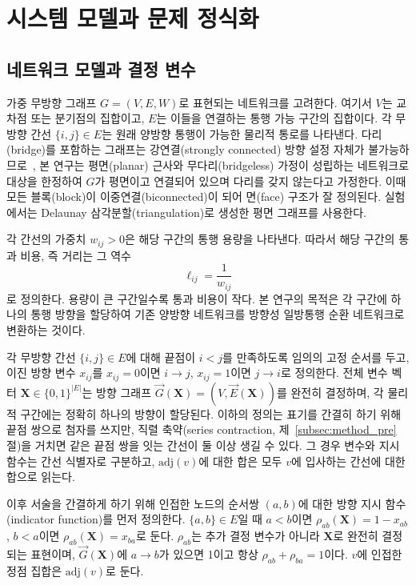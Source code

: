 \documentclass[twocolumn,a4paper]{article}
\begin{document}
\section{시스템 모델과 문제 정식화} \label{sec:model}

\subsection{네트워크 모델과 결정 변수} \label{subsec:model_graph}

가중 무방향 그래프 $G=(V,E,W)$로 표현되는 네트워크를 고려한다. 여기서 \(V\)는 교차점 또는 분기점의 집합이고, \(E\)는 이들을 연결하는 통행 가능 구간의 집합이다. 각 무방향 간선 \(\{i,j\}\in E\)는 원래 양방향 통행이 가능한 물리적 통로를 나타낸다. 다리(bridge)를 포함하는 그래프는 강연결(strongly connected) 방향 설정 자체가 불가능하므로~\cite{robbins1939theorem}, 본 연구는 평면(planar) 근사와 무다리(bridgeless) 가정이 성립하는 네트워크로 대상을 한정하여 \(G\)가 평면이고 연결되어 있으며 다리를 갖지 않는다고 가정한다. 이때 모든 블록(block)이 이중연결(biconnected)이 되어 면(face) 구조가 잘 정의된다. 실험에서는 Delaunay 삼각분할(triangulation)로 생성한 평면 그래프를 사용한다.

각 간선의 가중치 \(w_{ij}>0\)은 해당 구간의 통행 용량을 나타낸다. 따라서 해당 구간의 통과 비용, 즉 거리는 그 역수
\begin{equation}
    \ell_{ij}=\frac{1}{w_{ij}}
\end{equation}
로 정의한다. 용량이 큰 구간일수록 통과 비용이 작다. 본 연구의 목적은 각 구간에 하나의 통행 방향을 할당하여 기존 양방향 네트워크를 방향성 일방통행 순환 네트워크로 변환하는 것이다.

각 무방향 간선 \(\{i,j\}\in E\)에 대해 끝점이 \(i<j\)를 만족하도록 임의의 고정 순서를 두고, 이진 방향 변수 \(x_{ij}\)를 \(x_{ij}=0\)이면 \(i\rightarrow j\), \(x_{ij}=1\)이면 \(j\rightarrow i\)로 정의한다. 전체 변수 벡터 \(\mathbf{X}\in\{0,1\}^{|E|}\)는 방향 그래프 \(\vec{G}(\mathbf{X})=(V,\vec{E}(\mathbf{X}))\)를 완전히 결정하며, 각 물리적 구간에는 정확히 하나의 방향이 할당된다. 이하의 정의는 표기를 간결히 하기 위해 끝점 쌍으로 첨자를 쓰지만, 직렬 축약(series contraction, 제~\ref{subsec:method_pre}절)을 거치면 같은 끝점 쌍을 잇는 간선이 둘 이상 생길 수 있다. 그 경우 변수와 지시 함수는 간선 식별자로 구분하고, \(\mathrm{adj}(v)\)에 대한 합은 모두 \(v\)에 입사하는 간선에 대한 합으로 읽는다.

이후 서술을 간결하게 하기 위해 인접한 노드의 순서쌍 \((a,b)\)에 대한 방향 지시 함수(indicator function)를 먼저 정의한다.
\(\{a,b\}\in E\)일 때 \(a<b\)이면 \(\rho_{ab}(\mathbf{X})=1-x_{ab}\), \(b<a\)이면 \(\rho_{ab}(\mathbf{X})=x_{ba}\)로 둔다.
\(\rho_{ab}\)는 추가 결정 변수가 아니라 \(\mathbf{X}\)로 완전히 결정되는 표현이며, \(\vec{G}(\mathbf{X})\)에 \(a\rightarrow b\)가 있으면 1이고 항상 \(\rho_{ab}+\rho_{ba}=1\)이다. \(v\)에 인접한 정점 집합은 \(\mathrm{adj}(v)\)로 둔다.
\end{document}
